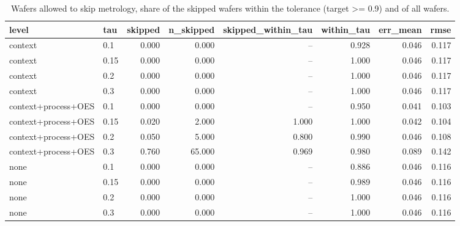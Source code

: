\begin{table}[t]
\centering
\caption{Wafers allowed to skip metrology, share of the skipped wafers within the tolerance (target >= 0.9) and of all wafers.}
\label{tab:skip}
\footnotesize
\begin{tabular}{llrrrrrr}
\toprule
level & tau & skipped & n\_skipped & skipped\_within\_tau & within\_tau & err\_mean & rmse \\
\midrule
context & 0.1 & 0.000 & 0.000 & -- & 0.928 & 0.046 & 0.117 \\
context & 0.15 & 0.000 & 0.000 & -- & 1.000 & 0.046 & 0.117 \\
context & 0.2 & 0.000 & 0.000 & -- & 1.000 & 0.046 & 0.117 \\
context & 0.3 & 0.000 & 0.000 & -- & 1.000 & 0.046 & 0.117 \\
context+process+OES & 0.1 & 0.000 & 0.000 & -- & 0.950 & 0.041 & 0.103 \\
context+process+OES & 0.15 & 0.020 & 2.000 & 1.000 & 1.000 & 0.042 & 0.104 \\
context+process+OES & 0.2 & 0.050 & 5.000 & 0.800 & 0.990 & 0.046 & 0.108 \\
context+process+OES & 0.3 & 0.760 & 65.000 & 0.969 & 0.980 & 0.089 & 0.142 \\
none & 0.1 & 0.000 & 0.000 & -- & 0.886 & 0.046 & 0.116 \\
none & 0.15 & 0.000 & 0.000 & -- & 0.989 & 0.046 & 0.116 \\
none & 0.2 & 0.000 & 0.000 & -- & 1.000 & 0.046 & 0.116 \\
none & 0.3 & 0.000 & 0.000 & -- & 1.000 & 0.046 & 0.116 \\
\bottomrule
\end{tabular}
\end{table}
